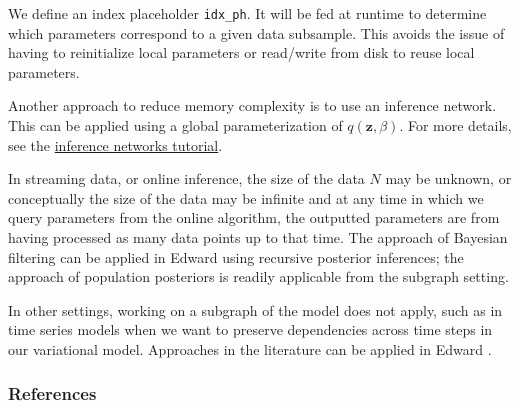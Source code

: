 We define an index placeholder \texttt{idx_ph}. It will be fed at
runtime to determine which parameters correspond to a given data
subsample. This avoids the issue of having to reinitialize local
parameters or read/write from disk to reuse local parameters.

Another approach to reduce memory complexity is to use an inference
network. This can be applied using a global parameterization of
$q(\mathbf{z}, \beta)$. For more details, see the
\href{/tutorials/inference-networks}{inference networks tutorial}.

In streaming data, or online inference, the size of the data $N$
may be unknown, or conceptually the size of the data may be
infinite and at any time in which we query parameters from the online
algorithm, the outputted parameters are from having processed as many
data points up to that time.
The approach of Bayesian filtering
\citep{doucet2000on,broderick2013streaming} can be applied in Edward using
recursive posterior inferences; the approach of population posteriors
\citep{mcinerney2015population} is readily applicable from the subgraph
setting.

In other settings, working on a subgraph of the model does not
apply, such as in time series models when we want to
preserve dependencies across time steps in our variational model.
Approaches in the literature can be applied in Edward
\citep{binder1997space,johnson2014stochastic,foti2014stochastic}.

\subsubsection{References}\label{references}
